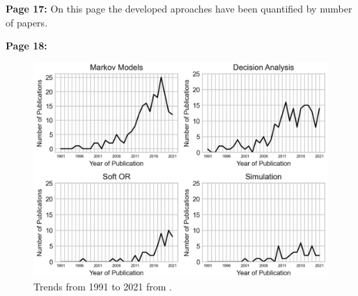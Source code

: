     \textbf{Page 17:}
    On this page the developed aproaches have been quantified by number of papers.
    
    \textbf{Page 18:}
    \begin{figure}[H]
        \centering
        \includegraphics[width=.9\textwidth]{figures/0005_SR02GB23/fig6.png}
        \caption{Trends from 1991 to 2021 from \cite{x122}.}
        \label{fig6:SR02GB23}
    \end{figure}
    
